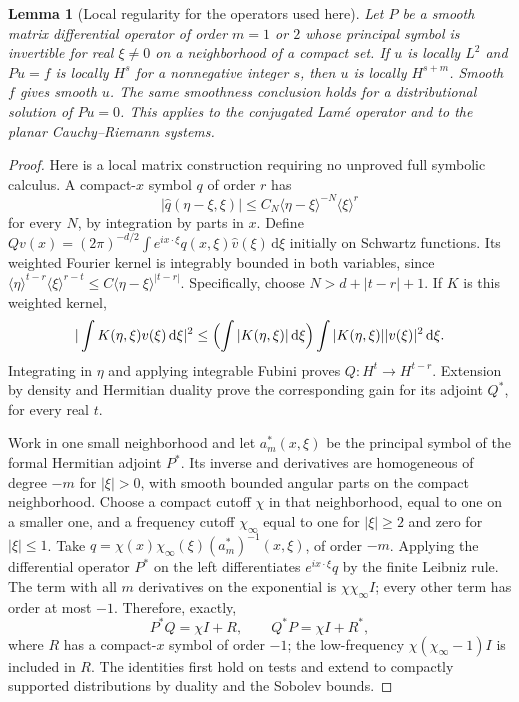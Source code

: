 \documentclass[11pt]{article}
\newcommand{\dd}{\mathrm d}
\newtheorem{lemma}[theorem]{Lemma}
\theoremstyle{remark}
\numberwithin{equation}{section}
\begin{document}
\begin{lemma}[Local regularity for the operators used here]
\label{lem:elliptic-background}
Let $P$ be a smooth matrix differential operator of order $m=1$ or $2$
whose principal symbol is invertible for real $\xi\ne0$ on a neighborhood
of a compact set. If $u$ is locally $L^2$ and $Pu=f$ is locally $H^s$
for a nonnegative integer $s$, then $u$ is locally $H^{s+m}$.
Smooth $f$ gives smooth $u$. The same smoothness conclusion holds for a
distributional solution of $Pu=0$. This applies to the conjugated Lam\'e
operator and to the planar Cauchy--Riemann systems.
\end{lemma}
\begin{proof}
Here is a local matrix construction requiring no unproved full symbolic
calculus. A compact-$x$ symbol $q$ of order $r$ has
\[
 |\widehat q(\eta-\xi,\xi)|
 \le C_N\langle\eta-\xi\rangle^{-N}\langle\xi\rangle^r
\]
for every $N$, by integration by parts in $x$. Define
$Qv(x)=(2\pi)^{-d/2}\int e^{ix\cdot\xi}q(x,\xi)\widehat v(\xi)
\,\dd\xi$ initially on Schwartz functions. Its weighted Fourier kernel
is integrably bounded in both variables, since
$\langle\eta\rangle^{t-r}\langle\xi\rangle^{r-t}
\le C\langle\eta-\xi\rangle^{|t-r|}$.
Specifically, choose $N>d+|t-r|+1$. If $K$ is this weighted kernel,
\[
 |\int K(\eta,\xi)v(\xi)\,\dd\xi|^2
 \le\Bigl(\int|K(\eta,\xi)|\,\dd\xi\Bigr)
       \int|K(\eta,\xi)||v(\xi)|^2\,\dd\xi.
\]
Integrating in $\eta$ and applying integrable Fubini proves
$Q:H^t\to H^{t-r}$. Extension by density and Hermitian duality prove the
corresponding gain for its adjoint $Q^*$, for every real $t$.

Work in one small neighborhood and let $a_m^*(x,\xi)$ be the principal
symbol of the formal Hermitian adjoint $P^*$. Its inverse and derivatives
are homogeneous of degree $-m$ for $|\xi|>0$, with smooth bounded angular
parts on the compact neighborhood. Choose a compact cutoff $\chi$ in
that neighborhood, equal to one on a smaller one, and a frequency cutoff
$\chi_\infty$ equal to one for $|\xi|\ge2$ and zero for $|\xi|\le1$.
Take $q=\chi(x)\chi_\infty(\xi)(a_m^*)^{-1}(x,\xi)$, of order $-m$.
Applying the differential operator $P^*$ on the left differentiates
$e^{ix\cdot\xi}q$ by the finite Leibniz rule. The term with all $m$
derivatives on the exponential is $\chi\chi_\infty I$; every other term
has order at most $-1$. Therefore, exactly,
\[
 P^*Q=\chi I+R,
 \qquad Q^*P=\chi I+R^*,
\]
where $R$ has a compact-$x$ symbol of order $-1$; the low-frequency
$\chi(\chi_\infty-1)I$ is included in $R$. The identities first hold on
tests and extend to compactly supported distributions by duality and
the Sobolev bounds.


\end{proof}
\end{document}
